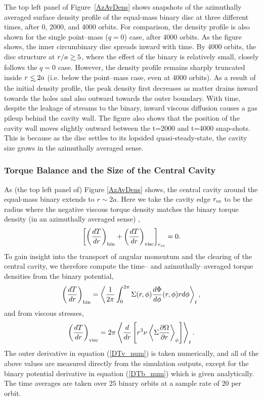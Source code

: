 The top left panel of Figure~\ref{AzAvDens} shows snapshots of the
azimuthally averaged surface density profile of the equal-mass binary
disc at three different times, after 0, 2000, and 4000 orbits. For
comparison, the density profile is also shown for the single
point--mass ($q=0$) case, after 4000 orbits.  As the figure shows, the
inner circumbinary disc spreads inward with time. By 4000 orbits, the
disc structure at $r/a\gsim 5$, where the effect of the binary is
relatively small, closely follows the $q=0$ case.  However, the
density profile remains sharply truncated inside $r \lsim 2a$
(i.e. below the point--mass case, even at 4000 orbits).  As a result of the initial density profile, the peak
density first decreases as matter drains inward towards the holes and also
outward towards the outer boundary. With time, despite the leakage of 
streams to the binary, inward viscous diffusion causes a gas 
pileup behind the cavity wall.   The figure also shows that the
position of the cavity wall moves slightly outward between the t=2000
and t=4000 snap-shots. This is because as the disc settles to its
lopsided quasi-steady-state, the cavity size grows in the azimuthally
averaged sense.



\subsubsection{Torque Balance and the Size of the Central Cavity}
\label{Torque Balance and the Size of the Central Cavity}

As (the top left panel of) Figure \ref{AzAvDens} shows, the central
cavity around the equal-mass binary extends to $r \sim 2a$.  Here
we take the cavity edge $r_{\rm{ce}}$ to be the radius where the negative 
viscous torque density matches the binary torque density (in an azimuthally averaged sense) ,
%
\begin{equation}
\left[ \left(\frac{dT}{dr}\right)_{\rm{bin}}  + \left(\frac{dT}{dr}\right)_{\rm{visc}} \right]_{r_{\rm ce}} = 0.
\label{TrqBalRCE}
\end{equation}
%
To gain insight into the transport of angular momentum and the
clearing of the central cavity, we therefore compute the time-- and
azimuthally--averaged torque densities from the binary potential,
%
\begin{equation}
\left(\frac{dT}{dr}\right)_{\rm{bin}} = \left< \frac{1}{2 \pi}  \int^{2 \pi}_{0}{ \Sigma(r, \phi) \frac{d\Phi}{d\phi}(r,\phi) r d\phi }\right>_{t},
\label{DTb_num}
\end{equation}
%
and from viscous stresses,
%
\begin{equation}
\left(\frac{dT}{dr}\right)_{\rm{visc}} = 2 \pi \left<  \frac{d}{dr}\left[ r^3 \nu \left< \Sigma \frac{\partial \Omega}{\partial r} \right>_{\phi}\right] \right>_{t}.
\label{DTv_num}
\end{equation}
%
The outer derivative in equation (\ref{DTv_num}) is taken numerically,
and all of the above values are measured directly from the simulation
outputs, except for the binary potential derivative in equation
(\ref{DTb_num}) which is given analytically. The time averages are 
taken over $25$ binary orbits at a sample rate of 20 per orbit.


